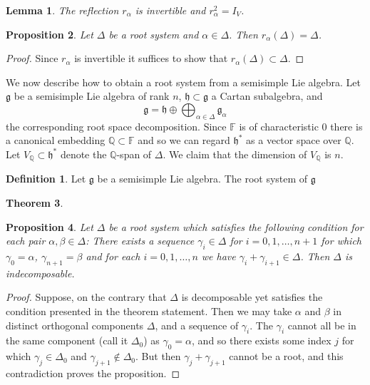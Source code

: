 \documentclass[12pt]{article}
\theoremstyle{plain}
\newtheorem{thm}{Theorem}[section]
\newtheorem{lemma}[thm]{Lemma}
\newtheorem{prop}[thm]{Proposition}
\theoremstyle{definition}
\newtheorem{defn}{Definition}[section]
\numberwithin{equation}{section}
\newcommand{\al}{\alpha}
\newcommand{\D}{\Delta}
\newcommand{\F}{\mathbb{F}}
\newcommand{\Q}{\mathbb{Q}}
\newcommand{\g}{\mathfrak{g}}
\newcommand{\h}{\mathfrak{h}}
\begin{document}
\begin{lemma}
The reflection $r_\al$ is invertible and $r_\al^2 = I_V$.
\end{lemma}

\begin{prop}
Let $\D$ be a root system and $\al \in \D$. Then $r_\al(\D) = \D$.
\end{prop}

\begin{proof}
Since $r_\al$ is invertible it suffices to show that $r_\al(\D) \subset \D$.
\end{proof}



We now describe how to obtain a root system from a semisimple Lie algebra. Let $\g$ be a semisimple Lie algebra of rank $n$, $\h \subset \g$ a Cartan subalgebra, and
\[
\g = \h \oplus \bigoplus_{\al \in \D} \g_\al
\]
the corresponding root space decomposition. Since $\F$ is of characteristic $0$ there is a canonical embedding $\Q \subset \F$ and so we can regard $\h^*$ as a vector space over $\Q$. Let $V_\Q \subset \h^*$ denote the $\Q$-span of $\D$. We claim that the dimension of $V_\Q$ is $n$.

\begin{defn}
Let $\g$ be a semisimple Lie algebra. The root system of $\g$
\end{defn}


\begin{thm}

\end{thm}



\begin{prop}
Let $\D$ be a root system which satisfies the following condition for each pair $\al, \beta \in \D$: There exists a sequence $\gamma_i \in \D$ for $i = 0, 1, \ldots, n+1$ for which $\gamma_0 = \al$, $\gamma_{n+1} = \beta$ and for each $i = 0, 1, \ldots, n$ we have $\gamma_i + \gamma_{i+1} \in \D$. Then $\D$ is indecomposable.
\end{prop}

\begin{proof}
Suppose, on the contrary that $\D$ is decomposable yet satisfies the condition presented in the theorem statement. Then we may take $\al$ and $\beta$ in distinct orthogonal components $\D$, and a sequence of $\gamma_i$. The $\gamma_i$ cannot all be in the same component (call it $\D_0$) as $\gamma_0 = \al$, and so there exists some index $j$ for which $\gamma_j \in \D_0$ and $\gamma_{j+1} \notin \D_0$. But then $\gamma_j + \gamma_{j+1}$ cannot be a root, and this contradiction proves the proposition.
\end{proof}
\end{document}
